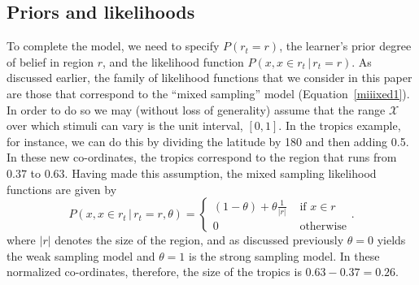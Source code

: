 \documentclass[doc]{apa6}
\newcommand{\p}{P}
\newcommand{\rt}{{r_t}}
\newcommand{\condon}{\, | \,}
\begin{document}
\subsection{Priors and likelihoods}

To complete the model, we need to specify $P(\rt = r)$, the learner's prior degree of belief in region $r$, and the likelihood function $P(x, x \in \rt \condon  \rt = r)$. As discussed earlier, the family of likelihood functions that we consider in this paper are those that correspond to the ``mixed sampling'' model (Equation~\ref{miiixed1}). In order to do so we may (without loss of generality) assume that the range $\mathcal{X}$ over which stimuli can vary is the unit interval, $[0,1]$. In the tropics example, for instance, we can do this by dividing the latitude by 180 and then adding 0.5. In these new co-ordinates, the tropics correspond to the region that runs from $0.37$ to $0.63$. Having made this assumption, the mixed sampling likelihood functions are given by
\begin{equation}
\p(x, x \in \rt \condon  \rt=r, \theta) = \left\{ \begin{array}{cl} (1-\theta) + \theta\displaystyle\frac{1}{|r|} & \mbox{ if } x \in r \\ 0 & \mbox{ otherwise} \end{array} \right.. \label{miiixed}
\end{equation}
where $|r|$ denotes the size of the region, and as discussed previously $\theta=0$ yields the weak sampling model and $\theta=1$ is the strong sampling model. In these normalized co-ordinates, therefore, the size of the tropics is $0.63 - 0.37 = 0.26$.
\end{document}
